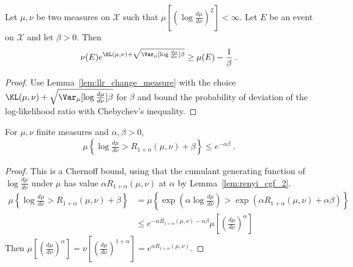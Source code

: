 \begin{lemma}
  \label{lem:llr_change_measure_variance}
  \uses{}
  Let $\mu, \nu$ be two measures on $\mathcal X$ such that $\mu\left[\left(\log\frac{d \mu}{d \nu}\right)^2\right] < \infty$. Let $E$ be an event on $\mathcal X$ and let $\beta > 0$. Then
  \begin{align*}
  \nu(E) e^{\KL(\mu, \nu) + \sqrt{\Var_\mu[\log\frac{d \mu}{d \nu}]\beta}} \ge \mu(E) - \frac{1}{\beta} \: .
  \end{align*}
\end{lemma}

\begin{proof}%
{}
Use Lemma~\ref{lem:llr_change_measure} with the choice $\KL(\mu, \nu) + \sqrt{\Var_\mu[\log\frac{d \mu}{d \nu}]\beta}$ for $\beta$ and bound the probability of deviation of the log-likelihood ratio with Chebychev's inequality.
\end{proof}

\begin{lemma}
  \label{lem:renyi_chernoff_bound}
  \leanok
  For $\mu, \nu$ finite measures and $\alpha, \beta > 0$,
  \begin{align*}
  \mu\left\{ \log\frac{d \mu}{d \nu} > R_{1+\alpha}(\mu, \nu) + \beta \right\}
  \le e^{- \alpha \beta}
  \: .
  \end{align*}
\end{lemma}

\begin{proof}\leanok
{}
This is a Chernoff bound, using that the cumulant generating function of $\log\frac{d\mu}{d\nu}$ under $\mu$ has value $\alpha R_{1+\alpha}(\mu, \nu)$ at $\alpha$ by Lemma~\ref{lem:renyi_cgf_2}.
\begin{align*}
\mu\left\{ \log\frac{d \mu}{d \nu} > R_{1+\alpha}(\mu, \nu) + \beta \right\}
&= \mu\left\{ \exp\left(\alpha\log\frac{d \mu}{d \nu}\right) > \exp\left(\alpha R_{1+\alpha}(\mu, \nu) + \alpha \beta\right) \right\}
\\
&\le e^{-\alpha R_{1+\alpha}(\mu, \nu) - \alpha \beta} \mu\left[\left(\frac{d \mu}{d \nu}\right)^\alpha \right]
\end{align*}
Then $\mu\left[\left(\frac{d \mu}{d \nu}\right)^\alpha \right] = \nu\left[\left(\frac{d \mu}{d \nu}\right)^{1+\alpha} \right] = e^{\alpha R_{1+\alpha}(\mu, \nu)}$.
\end{proof}


